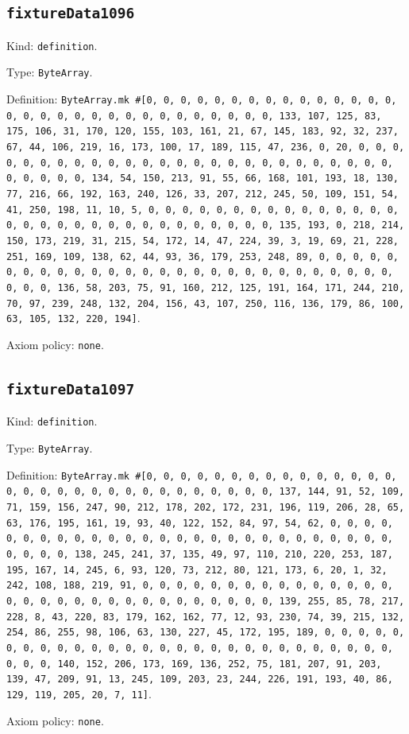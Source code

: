 \documentclass[11pt]{article}
\begin{document}
\subsection*{\texttt{fixtureData1096}}
\noindent Kind: \texttt{definition}.\par
\noindent Type: \texttt{ByteArray}.\par
\noindent Definition: \texttt{ByteArray.mk \#[0, 0, 0, 0, 0, 0, 0, 0, 0, 0, 0, 0, 0, 0, 0, 0, 0, 0, 0, 0, 0, 0, 0, 0, 0, 0, 0, 0, 0, 0, 0, 133, 107, 125, 83, 175, 106, 31, 170, 120, 155, 103, 161, 21, 67, 145, 183, 92, 32, 237, 67, 44, 106, 219, 16, 173, 100, 17, 189, 115, 47, 236, 0, 20, 0, 0, 0, 0, 0, 0, 0, 0, 0, 0, 0, 0, 0, 0, 0, 0, 0, 0, 0, 0, 0, 0, 0, 0, 0, 0, 0, 0, 0, 0, 0, 134, 54, 150, 213, 91, 55, 66, 168, 101, 193, 18, 130, 77, 216, 66, 192, 163, 240, 126, 33, 207, 212, 245, 50, 109, 151, 54, 41, 250, 198, 11, 10, 5, 0, 0, 0, 0, 0, 0, 0, 0, 0, 0, 0, 0, 0, 0, 0, 0, 0, 0, 0, 0, 0, 0, 0, 0, 0, 0, 0, 0, 0, 0, 0, 135, 193, 0, 218, 214, 150, 173, 219, 31, 215, 54, 172, 14, 47, 224, 39, 3, 19, 69, 21, 228, 251, 169, 109, 138, 62, 44, 93, 36, 179, 253, 248, 89, 0, 0, 0, 0, 0, 0, 0, 0, 0, 0, 0, 0, 0, 0, 0, 0, 0, 0, 0, 0, 0, 0, 0, 0, 0, 0, 0, 0, 0, 0, 0, 136, 58, 203, 75, 91, 160, 212, 125, 191, 164, 171, 244, 210, 70, 97, 239, 248, 132, 204, 156, 43, 107, 250, 116, 136, 179, 86, 100, 63, 105, 132, 220, 194]}.\par
\noindent Axiom policy: \texttt{none}.\par
\subsection*{\texttt{fixtureData1097}}
\noindent Kind: \texttt{definition}.\par
\noindent Type: \texttt{ByteArray}.\par
\noindent Definition: \texttt{ByteArray.mk \#[0, 0, 0, 0, 0, 0, 0, 0, 0, 0, 0, 0, 0, 0, 0, 0, 0, 0, 0, 0, 0, 0, 0, 0, 0, 0, 0, 0, 0, 0, 0, 137, 144, 91, 52, 109, 71, 159, 156, 247, 90, 212, 178, 202, 172, 231, 196, 119, 206, 28, 65, 63, 176, 195, 161, 19, 93, 40, 122, 152, 84, 97, 54, 62, 0, 0, 0, 0, 0, 0, 0, 0, 0, 0, 0, 0, 0, 0, 0, 0, 0, 0, 0, 0, 0, 0, 0, 0, 0, 0, 0, 0, 0, 0, 0, 138, 245, 241, 37, 135, 49, 97, 110, 210, 220, 253, 187, 195, 167, 14, 245, 6, 93, 120, 73, 212, 80, 121, 173, 6, 20, 1, 32, 242, 108, 188, 219, 91, 0, 0, 0, 0, 0, 0, 0, 0, 0, 0, 0, 0, 0, 0, 0, 0, 0, 0, 0, 0, 0, 0, 0, 0, 0, 0, 0, 0, 0, 0, 0, 139, 255, 85, 78, 217, 228, 8, 43, 220, 83, 179, 162, 162, 77, 12, 93, 230, 74, 39, 215, 132, 254, 86, 255, 98, 106, 63, 130, 227, 45, 172, 195, 189, 0, 0, 0, 0, 0, 0, 0, 0, 0, 0, 0, 0, 0, 0, 0, 0, 0, 0, 0, 0, 0, 0, 0, 0, 0, 0, 0, 0, 0, 0, 0, 140, 152, 206, 173, 169, 136, 252, 75, 181, 207, 91, 203, 139, 47, 209, 91, 13, 245, 109, 203, 23, 244, 226, 191, 193, 40, 86, 129, 119, 205, 20, 7, 11]}.\par
\noindent Axiom policy: \texttt{none}.\par
\end{document}
